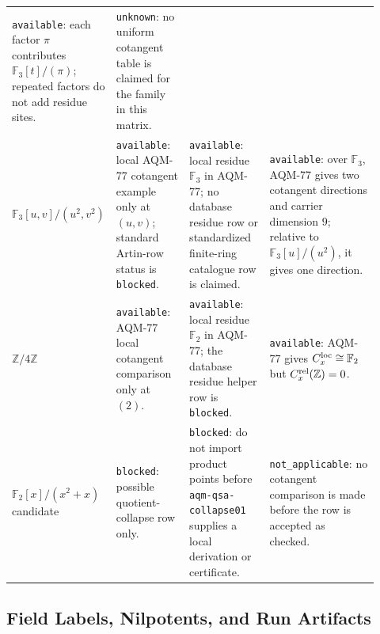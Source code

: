 \begin{center}
\begin{tabular}{p{0.20\linewidth}p{0.20\linewidth}p{0.22\linewidth}p{0.30\linewidth}}
\texttt{available}: each factor \(\pi\) contributes
\(\mathbb F_3[t]/(\pi)\); repeated factors do not add residue sites. &
\texttt{unknown}: no uniform cotangent table is claimed for the family in
this matrix. \\
\addlinespace
\(\mathbb F_3[u,v]/(u^2,v^2)\) &
\texttt{available}: local AQM-77 cotangent example only at
\((u,v)\); standard Artin-row status is \texttt{blocked}. &
\texttt{available}: local residue \(\mathbb F_3\) in AQM-77; no
database residue row or standardized finite-ring catalogue row is claimed. &
\texttt{available}: over \(\mathbb F_3\), AQM-77 gives two cotangent
directions and carrier dimension \(9\); relative to
\(\mathbb F_3[u]/(u^2)\), it gives one direction. \\
\addlinespace
\(\mathbb Z/4\mathbb Z\) &
\texttt{available}: AQM-77 local cotangent comparison only at
\((2)\). &
\texttt{available}: local residue \(\mathbb F_2\) in AQM-77; the database
residue helper row is \texttt{blocked}. &
\texttt{available}: AQM-77 gives
\(C_x^{\rm loc}\cong\mathbb F_2\) but
\(C_x^{\rm rel}(\mathbb Z)=0\). \\
\addlinespace
\(\mathbb F_2[x]/(x^2+x)\) candidate &
\texttt{blocked}: possible quotient-collapse row only. &
\texttt{blocked}: do not import product points before
\texttt{aqm-qsa-collapse01} supplies a local derivation or certificate. &
\texttt{not\_applicable}: no cotangent comparison is made before the row is
accepted as checked. \\
\bottomrule
\end{tabular}
\end{center}

\subsection{Field Labels, Nilpotents, and Run Artifacts}

